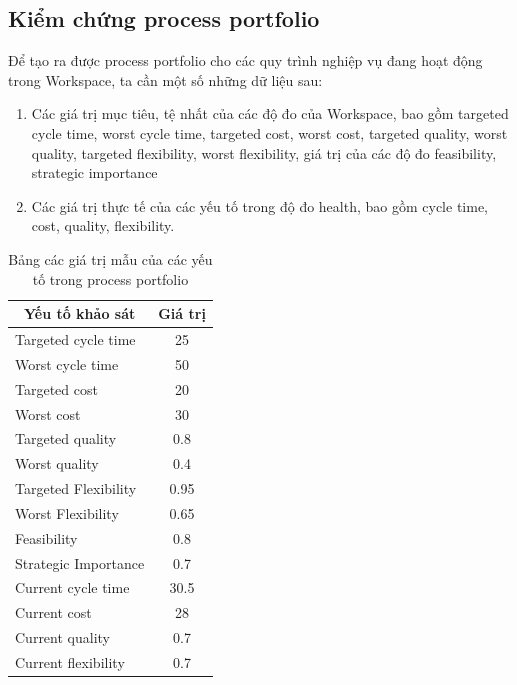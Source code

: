 \subsection{Kiểm chứng process portfolio}
Để tạo ra được process portfolio cho các quy trình nghiệp vụ đang hoạt động trong Workspace, ta cần một số những dữ liệu sau:
\begin{enumerate}
    \item Các giá trị mục tiêu, tệ nhất của các độ đo của Workspace, bao gồm targeted cycle time, worst cycle time, targeted cost, worst cost, 
    targeted quality, worst quality, targeted flexibility, worst flexibility, giá trị của các độ đo feasibility, strategic importance
    \item Các giá trị thực tế của các yếu tố trong độ đo health, bao gồm cycle time, cost, quality, flexibility.
\end{enumerate}
\begin{table}[H]
    \def\arraystretch{1.5}%
    \centering
    \begin{tabular}{|l|c|}
        \hline
        \multicolumn{1}{|c|}{\textbf{Yếu tố khảo sát}} & \textbf{Giá trị} \\ \hline
        Targeted cycle time & 25 \\ \hline
        Worst cycle time & 50 \\ \hline
        Targeted cost & 20 \\ \hline
        Worst cost & 30 \\ \hline
        Targeted quality & 0.8 \\ \hline
        Worst quality & 0.4 \\ \hline
        Targeted Flexibility & 0.95 \\ \hline
        Worst Flexibility & 0.65 \\ \hline
        Feasibility & 0.8 \\ \hline
        Strategic Importance & 0.7 \\ \hline
        Current cycle time & 30.5 \\ \hline
        Current cost & 28 \\ \hline
        Current quality & 0.7 \\ \hline
        Current flexibility & 0.7 \\ \hline
    \end{tabular}
    \caption{Bảng các giá trị mẫu của các yếu tố trong process portfolio}
\end{table}

